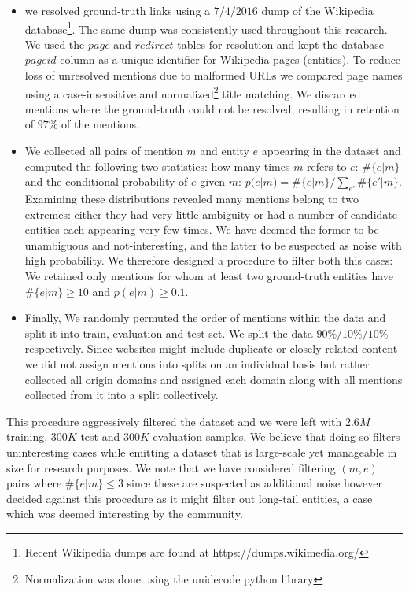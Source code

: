 \documentclass[11pt]{article}
\begin{document}
	\begin{itemize} 
		\item we resolved ground-truth links using a $7/4/2016$ dump of the Wikipedia database\footnote{Recent Wikipedia dumps are found at https://dumps.wikimedia.org/}. The same dump was consistently used throughout this research. We used the $page$ and $redirect$ tables for resolution and kept the database $pageid$ column as a unique identifier for Wikipedia pages (entities). To reduce loss of unresolved mentions due to malformed URLs we compared page names using a case-insensitive and normalized\footnote{Normalization was done using the unidecode python library} title matching. We discarded mentions where the ground-truth could not be resolved, resulting in retention of $97\%$ of the mentions.
		\item We collected all pairs of mention $m$ and entity $e$ appearing in the dataset and computed the following two statistics: how many times $m$ refers to $e$: $\#\{e|m\}$ and the conditional probability of $e$ given $m$: $p(e|m)=\#\{e|m\}/\sum_{e'}\#\{e'|m\}$. Examining these distributions revealed many mentions belong to two extremes: either they had very little ambiguity or had a number of candidate entities each appearing very few times. We have deemed the former to be unambiguous and not-interesting, and the latter to be suspected as noise with high probability. We therefore designed a procedure to filter both this cases: We retained only mentions for whom at least two ground-truth entities have $\#\{e|m\}\ge 10$ and $p(e|m)\ge0.1$. 
		\item Finally, We randomly permuted the order of mentions within the data and split it into train, evaluation and test set. We split the data $90\% / 10\% / 10\%$ respectively. Since websites might include duplicate or closely related content we did not assign mentions into splits on an individual basis but rather collected all origin domains and assigned each domain along with all mentions collected from it into a split collectively.
	\end{itemize}
	
	This procedure aggressively filtered the dataset and we were left with $2.6M$ training, $300K$ test and $300K$ evaluation samples. We believe that doing so filters uninteresting cases while emitting a dataset that is large-scale yet manageable in size for research purposes. We note that we have considered filtering $(m,e)$ pairs where $\#\{e|m\}\le 3$ since these are suspected as additional noise however decided against this procedure as it might filter out long-tail entities, a case which was deemed interesting by the community.
	
\end{document}
